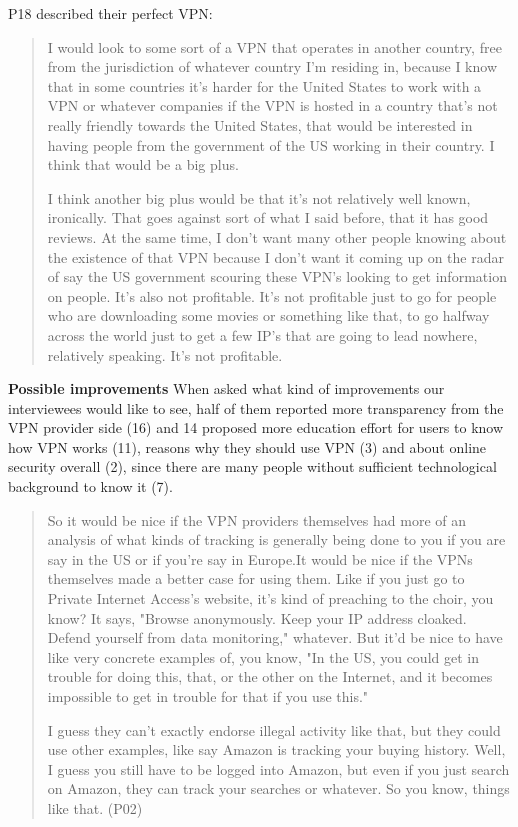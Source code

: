 P18 described their perfect VPN:
\begin{quote}I would look to some sort of a VPN that operates in another country, free from the jurisdiction of whatever country I'm residing in, because I know that in some countries it's harder for the United States to work with a VPN or whatever companies if the VPN is hosted in a country that's not really friendly towards the United States, that would be interested in having people from the government of the US working in their country. I think that would be a big plus.


I think another big plus would be that it's not relatively well known, ironically. That goes against sort of what I said before, that it has good reviews. At the same time, I don't want many other people knowing about the existence of that VPN because I don't want it coming up on the radar of say the US government scouring these VPN's looking to get information on people. It's also not profitable. It's not profitable just to go for people who are downloading some movies or something like that, to go halfway across the world just to get a few IP's that are going to lead nowhere, relatively speaking. It's not profitable.\end{quote}


\textbf{Possible improvements}
When asked what kind of improvements our interviewees would like to see, half of them reported more transparency from the VPN provider side (16) and 14 proposed more education effort for users to know how VPN works (11), reasons why they should use VPN (3) and about online security overall (2), since there are many people without sufficient technological background to know it (7). 

\begin{quote}So it would be nice if the VPN providers themselves had more of an analysis of what kinds of tracking is generally being done to you if you are say in the US or if you're say in Europe.It would be nice if the VPNs themselves made a better case for using them. Like if you just go to Private Internet Access's website, it's kind of preaching to the choir, you know? It says, "Browse anonymously. Keep your IP address cloaked. Defend yourself from data monitoring," whatever. But it'd be nice to have like very concrete examples of, you know, "In the US, you could get in trouble for doing this, that, or the other on the Internet, and it becomes impossible to get in trouble for that if you use this."

I guess they can't exactly endorse illegal activity like that, but they could use other examples, like say Amazon is tracking your buying history. Well, I guess you still have to be logged into Amazon, but even if you just search on Amazon, they can track your searches or whatever. So you know, things like that. (P02)\end{quote}


